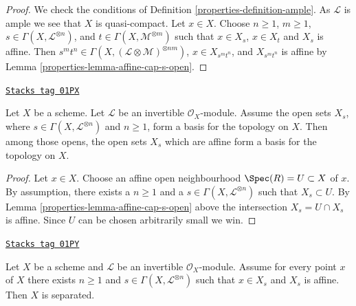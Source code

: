 \begin{proof}

We check the conditions of Definition \ref{properties-definition-ample}.
As $\mathcal{L}$ is ample we see that $X$ is quasi-compact.
Let $x \in X$. Choose $n \geq 1$, $m \geq 1$,
$s \in \Gamma(X, \mathcal{L}^{\otimes n})$, and
$t \in \Gamma(X, \mathcal{M}^{\otimes m})$
such that $x \in X_s$, $x \in X_t$ and $X_s$ is affine.
Then $s^mt^n \in \Gamma(X, (\mathcal{L} \otimes \mathcal{M})^{\otimes nm})$,
$x \in X_{s^mt^n}$, and $X_{s^mt^n}$ is affine by
Lemma \ref{properties-lemma-affine-cap-s-open}.
\end{proof}

\begin{lemma}
\label{properties-lemma-affine-s-opens}
\href{https://stacks.math.columbia.edu/tag/01PX}{\texttt{Stacks tag 01PX}}

Let $X$ be a scheme. Let $\mathcal{L}$ be an invertible $\mathcal{O}_X$-module.
Assume the open sets $X_s$, where $s \in \Gamma(X, \mathcal{L}^{\otimes n})$
and $n \geq 1$, form a basis for the topology on $X$.
Then among those opens, the open sets $X_s$ which are affine
form a basis for the topology on $X$.
\end{lemma}

\begin{proof}

Let $x \in X$. Choose an affine open neighbourhood
$\Spec(R) = U \subset X$ of $x$.
By assumption, there exists
a $n \geq 1$ and a $s \in \Gamma(X, \mathcal{L}^{\otimes n})$
such that $X_s \subset U$. By Lemma \ref{properties-lemma-affine-cap-s-open} above
the intersection $X_s = U \cap X_s$ is affine.
Since $U$ can be chosen arbitrarily small we win.
\end{proof}

\begin{lemma}
\label{properties-lemma-affine-s-opens-cover-quasi-separated}
\href{https://stacks.math.columbia.edu/tag/01PY}{\texttt{Stacks tag 01PY}}

Let $X$ be a scheme and $\mathcal{L}$ be an invertible $\mathcal{O}_X$-module.
Assume for every point $x$ of $X$ there exists $n \geq 1$ and
$s \in \Gamma(X, \mathcal{L}^{\otimes n})$ such that
$x \in X_s$ and $X_s$ is affine. Then $X$ is separated.
\end{lemma}

